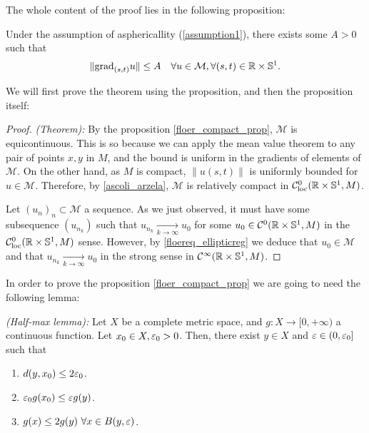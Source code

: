 The whole content of the proof lies in the following proposition:

\begin{prop} \label{floer_compact_prop}
Under the assumption of asphericallity (\ref{assumption1}), there exists some $A > 0$ such that
\[\|\grad_{(s,t)}u\| \leq A \ \ \ \forall u \in \mathcal{M}, \forall (s,t) \in \R \times \con{S}^1 .\]
\end{prop}

We will first prove the theorem using the proposition, and then the proposition itself:

\begin{proof} {\it (Theorem):} By the proposition \ref{floer_compact_prop}, $\mathcal{M}$ is equicontinuous. This is so because we can apply the mean value theorem to any pair of points $x,y$ in $M$, and the bound is uniform in the gradients of elements of $\mathcal{M}$. On the other hand, as $M$ is compact, $\|u(s,t)\|$ is uniformly bounded for $u \in \mathcal{M}$. Therefore, by \ref{ascoli_arzela}, $\mathcal{M}$ is relatively compact in $\mathcal{C}_{\text{loc}}^0(\mathbb{R} \times \mathbb{S}^1,M)$.

Let $(u_n)_n \subset \mathcal{M}$ a sequence. As we just observed, it must have some subsequence $(u_{n_k})$ such that $u_{n_k} \xrightarrow[k \rightarrow \infty]{} u_0$ for some $u_0 \in \mathcal{C}^0(\mathbb{R}\times\mathbb{S}^1,M)$ in the $\mathcal{C}_{\text{loc}}^0(\mathbb{R}\times\mathbb{S}^1,M)$ sense. However, by \ref{floereq_ellipticreg} we deduce that $u_0 \in \mathcal{M}$ and that $u_{n_k} \xrightarrow[k\rightarrow \infty]{} u_0$ in the strong sense in $\mathcal{C}^{\infty}(\mathbb{R} \times \mathbb{S}^1,M)$.
\end{proof}

In order to prove the proposition \ref{floer_compact_prop} we are going to need the following lemma:

\begin{lema}
{\it (Half-max lemma):} Let $X$ be a complete metric space, and $g : X \rightarrow  [0,+\infty)$ a continuous function. Let $x_0 \in X, \varepsilon_0 > 0$. Then, there exist $y \in X$ and $\varepsilon \in (0,\varepsilon_0]$ such that
\begin{enumerate}
	\item $d(y,x_0) \leq 2\varepsilon_0$.
	\item $\varepsilon_0 g(x_0) \leq \varepsilon g(y)$.
	\item $g(x) \leq 2g(y) \ \forall x \in B(y,\varepsilon)$.
\end{enumerate}
\end{lema}

